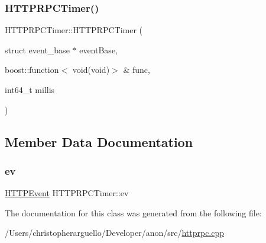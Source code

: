 \subsubsection{\texorpdfstring{H\+T\+T\+P\+R\+P\+C\+Timer()}{HTTPRPCTimer()}}
{\footnotesize\ttfamily H\+T\+T\+P\+R\+P\+C\+Timer\+::\+H\+T\+T\+P\+R\+P\+C\+Timer (\begin{DoxyParamCaption}\item[{struct event\+\_\+base $\ast$}]{event\+Base,  }\item[{boost\+::function$<$ void(void)$>$ \&}]{func,  }\item[{int64\+\_\+t}]{millis }\end{DoxyParamCaption})\hspace{0.3cm}{\ttfamily [inline]}}



\subsection{Member Data Documentation}
\mbox{\label{class_h_t_t_p_r_p_c_timer_aca63bafcdfbea3f1a2c30b0c8c885a56}} 
\subsubsection{\texorpdfstring{ev}{ev}}
{\footnotesize\ttfamily \mbox{\hyperlink{class_h_t_t_p_event}{H\+T\+T\+P\+Event}} H\+T\+T\+P\+R\+P\+C\+Timer\+::ev\hspace{0.3cm}{\ttfamily [private]}}



The documentation for this class was generated from the following file\+:\begin{DoxyCompactItemize}
\item 
/\+Users/christopherarguello/\+Developer/anon/src/\mbox{\hyperlink{httprpc_8cpp}{httprpc.\+cpp}}\end{DoxyCompactItemize}
